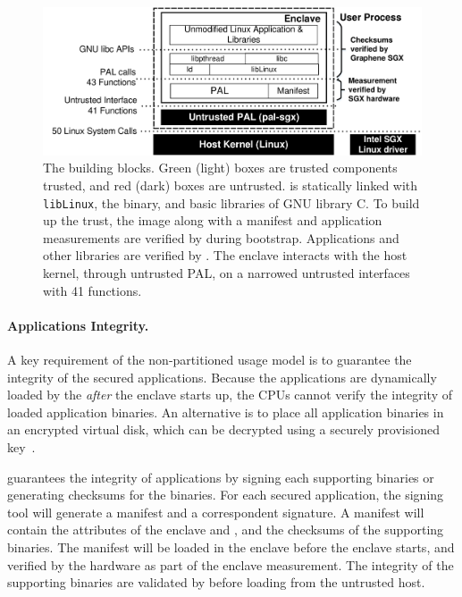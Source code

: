 \begin{figure}[t!]
\centering
\includegraphics[width=5in]{graphene-sgx/figures/architecture.pdf}
\footnotesize
\caption[The \graphenesgx{} building blocks]
{The \graphenesgx{} building blocks.
Green (light) boxes are trusted components trusted,
and red (dark) boxes are untrusted.
\graphenesgx{} is statically linked with {\tt libLinux},
the \libos{} binary, and basic libraries of GNU library C.
To build up the trust, the \graphenesgx{} image along with
a manifest and application measurements
are verified by \sgx{} during bootstrap. Applications and other libraries
are verified by \graphenesgx{}. The enclave interacts with the host kernel,
through untrusted PAL, on a narrowed untrusted interfaces with 41 functions.}
\label{fig:gsgx:arch}
\end{figure}

\paragraph{Applications Integrity.}
A key requirement of the non-partitioned usage model is to guarantee the integrity of the secured applications.
Because the applications are dynamically loaded by the \libos{}
{\em after} the enclave starts up,
the CPUs cannot verify the integrity of loaded application binaries.
An alternative is to place all application binaries in an encrypted virtual disk,
which can be decrypted using a securely provisioned key~\citep{baumann14haven}.

\graphenesgx{} guarantees the integrity of applications
by signing each supporting binaries or generating checksums for the binaries.
For each secured application, the signing tool will generate
a manifest and a correspondent signature.
A manifest will contain the attributes of the enclave and \libos{},
and the checksums of the supporting binaries.
The manifest will be loaded in the enclave before the enclave starts,
and verified by the hardware as part of the enclave measurement.
The integrity of the supporting binaries
are validated by \pal{} before loading from the untrusted host.


